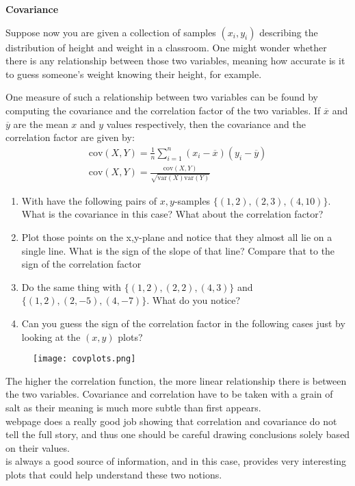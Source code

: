 {\begin{minipage}{43em}
\textbf{Covariance}

Suppose now you are given a collection of samples $(x_i, y_i)$ describing the distribution of height and weight in a classroom. One might wonder whether there is any relationship between those two variables, meaning how accurate is it to guess someone's weight knowing their height, for example.

One measure of such a relationship between two variables can be found by computing the covariance and the correlation factor of the two variables. If $\overline{x}$ and $\overline{y}$ are the mean $x$ and $y$ values respectively, then the covariance and the correlation factor are given by:
\[
\begin{split}
\text{cov}(X,Y)= \frac{1}{n} \sum_{i=1}^n (x_i-\overline{x})(y_i - \overline{y}) \\
\text{cov}(X,Y)= \frac{\text{cov}(X,Y)}{\sqrt{\text{var}(X)\text{var}(Y)}}
\end{split}
\]
\begin{enumerate}[1.]
\item With have the following pairs of $x,y$-samples $\{(1, 2), (2, 3), (4, 10)\}$. What is the covariance in this case? What about the correlation factor?
\item Plot those points on the x,y-plane and notice that they almost all lie on a single line. What is the sign of the slope of that line? Compare that to the sign of the correlation factor
\item Do the same thing with $\{(1, 2), (2, 2), (4, 3)\}$ and $\{(1, 2), (2, -5), (4, -7)\}$. What do you notice?
\item Can you guess the sign of the correlation factor in the following cases just by looking at the $(x,y)$ plots?
\end{enumerate}
\begin{figure}[H]
   \centering
   \texttt{[image: covplots.png]} 
\end{figure}
The higher the correlation function, the more linear relationship there is between the two variables. Covariance and correlation have to be taken with a grain of salt as their meaning is much more subtle than first appears. \\

 webpage does a really good job showing that correlation and covariance do not tell the full story, and thus one should be careful drawing conclusions solely based on their values. \\

 is always a good source of information, and in this case, provides very interesting plots that could help understand these two notions. \\ 

\end{minipage}} \vspace{0.2cm}

